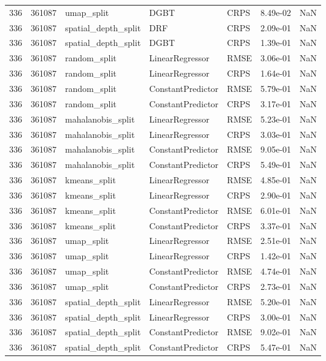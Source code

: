 \begin{tabular}{rrlllrr}
336 & 361087 & umap\_split & DGBT & CRPS & 8.49e-02 & NaN \\
336 & 361087 & spatial\_depth\_split & DRF & CRPS & 2.09e-01 & NaN \\
336 & 361087 & spatial\_depth\_split & DGBT & CRPS & 1.39e-01 & NaN \\
336 & 361087 & random\_split & LinearRegressor & RMSE & 3.06e-01 & NaN \\
336 & 361087 & random\_split & LinearRegressor & CRPS & 1.64e-01 & NaN \\
336 & 361087 & random\_split & ConstantPredictor & RMSE & 5.79e-01 & NaN \\
336 & 361087 & random\_split & ConstantPredictor & CRPS & 3.17e-01 & NaN \\
336 & 361087 & mahalanobis\_split & LinearRegressor & RMSE & 5.23e-01 & NaN \\
336 & 361087 & mahalanobis\_split & LinearRegressor & CRPS & 3.03e-01 & NaN \\
336 & 361087 & mahalanobis\_split & ConstantPredictor & RMSE & 9.05e-01 & NaN \\
336 & 361087 & mahalanobis\_split & ConstantPredictor & CRPS & 5.49e-01 & NaN \\
336 & 361087 & kmeans\_split & LinearRegressor & RMSE & 4.85e-01 & NaN \\
336 & 361087 & kmeans\_split & LinearRegressor & CRPS & 2.90e-01 & NaN \\
336 & 361087 & kmeans\_split & ConstantPredictor & RMSE & 6.01e-01 & NaN \\
336 & 361087 & kmeans\_split & ConstantPredictor & CRPS & 3.37e-01 & NaN \\
336 & 361087 & umap\_split & LinearRegressor & RMSE & 2.51e-01 & NaN \\
336 & 361087 & umap\_split & LinearRegressor & CRPS & 1.42e-01 & NaN \\
336 & 361087 & umap\_split & ConstantPredictor & RMSE & 4.74e-01 & NaN \\
336 & 361087 & umap\_split & ConstantPredictor & CRPS & 2.73e-01 & NaN \\
336 & 361087 & spatial\_depth\_split & LinearRegressor & RMSE & 5.20e-01 & NaN \\
336 & 361087 & spatial\_depth\_split & LinearRegressor & CRPS & 3.00e-01 & NaN \\
336 & 361087 & spatial\_depth\_split & ConstantPredictor & RMSE & 9.02e-01 & NaN \\
336 & 361087 & spatial\_depth\_split & ConstantPredictor & CRPS & 5.47e-01 & NaN \\

\end{tabular}
